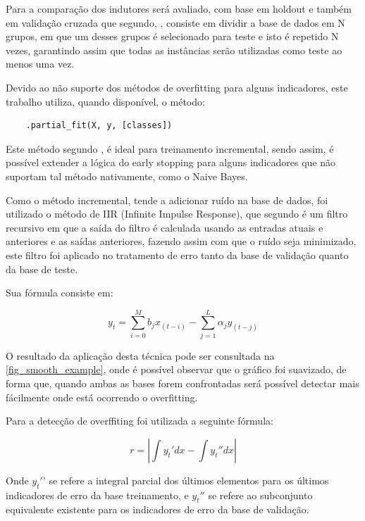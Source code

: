 \documentclass[
article,			%
11pt,				%
oneside,			%
a4paper,			%
english,			%
brazil,				%
sumario=tradicional,
]{abntex2}
\begin{document}
	Para a comparação dos indutores será avaliado, com base em holdout e também em validação cruzada que segundo, , consiste em dividir a base de dados em N grupos, em que um desses grupos é selecionado para teste e isto é repetido N vezes, garantindo assim que todas as instâncias serão utilizadas como teste ao menos uma vez.
	
	Devido ao não suporte dos métodos de overfitting para alguns indicadores, este trabalho utiliza, quando disponível, o método:
	
	\begin{verbatim}
	.partial_fit(X, y, [classes])
	\end{verbatim}
	
	Este método segundo , é ideal para treinamento incremental, sendo assim, é possível extender a lógica do early stopping para alguns indicadores que não suportam tal método nativamente, como o Naive Bayes.
	
	Como o método incremental, tende a adicionar ruído na base de dados, foi utilizado o método de IIR (Infinite Impulse Response), que segundo  é um filtro recursivo em que a saída do filtro é calculada usando as entradas atuais e anteriores e as saídas anteriores, fazendo assim com que o ruído seja minimizado, este filtro foi aplicado no tratamento de erro tanto da base de validação quanto da base de teste.
	
	Sua fórmula consiste em:
	
	\begin{equation}
	y_t = \sum_{i=0}^M b_jx_(t-i) - \sum_{j=1}^{L} \alpha_j y_(t-j)
	\end{equation}
	
	O resultado da aplicação desta técnica pode ser consultada na  \autoref{fig_smooth_example}, onde é possível observar que o gráfico foi suavizado, de forma que, quando ambas as bases forem confrontadas será possível detectar mais fácilmente onde está ocorrendo o overfitting.
	
	Para a detecção de overffiting foi utilizada a seguinte fórmula:
	
	\begin{equation}
	r = |\int  y_t' dx - \int y_t''dx|
	\end{equation}
	
	Onde \( y_t'  \)' se refere a integral parcial dos últimos elementos para os últimos indicadores de erro da base treinamento, e \( y_t'' \) se refere ao subconjunto equivalente existente para os indicadores de erro da base de validação.
	
\end{document}
